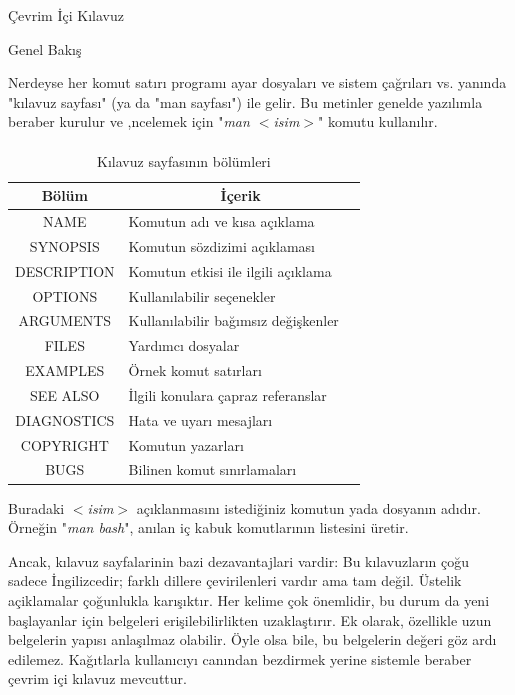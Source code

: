 \begin{section}{Çevrim İçi Kılavuz}
\begin{subsection}{Genel Bakış}

Nerdeyse her komut satırı programı ayar dosyaları ve sistem çağrıları vs. yanında "kılavuz sayfası" (ya da "man sayfası") ile gelir. Bu metinler genelde yazılımla beraber kurulur ve ,ncelemek için "\emph{man $<$isim$>$}" komutu kullanılır.

\paragraph{}{
\begin {table}[H]
\caption {Kılavuz sayfasının bölümleri} \label{tab:title} 
\begin{tabular}{c l @{} l}
\hline
Bölüm &
\multicolumn{2}{c}{İçerik} \\
\hline
NAME 	&	Komutun adı ve kısa açıklama \\
SYNOPSIS &	Komutun sözdizimi açıklaması \\
DESCRIPTION &	Komutun etkisi ile ilgili açıklama \\
OPTIONS &	Kullanılabilir seçenekler \\
ARGUMENTS &	Kullanılabilir bağımsız değişkenler \\
FILES 	&	Yardımcı dosyalar \\
EXAMPLES &	Örnek komut satırları \\
SEE ALSO &	İlgili konulara çapraz referanslar \\
DIAGNOSTICS &	Hata ve uyarı mesajları \\
COPYRIGHT & 	Komutun yazarları \\
BUGS	&	Bilinen komut sınırlamaları \\
\hline
\end{tabular}
\end {table}
}

Buradaki \emph{$<$isim$>$} açıklanmasını istediğiniz komutun yada dosyanın adıdır. Örneğin "\emph{man bash}", anılan iç kabuk komutlarının listesini üretir.

Ancak, kılavuz sayfalarinin bazi dezavantajlari vardir: Bu kılavuzların çoğu sadece İngilizcedir; farklı dillere çevirilenleri vardır ama tam değil. Üstelik açiklamalar çoğunlukla karışıktır. Her kelime çok önemlidir, bu durum da yeni başlayanlar için belgeleri erişilebilirlikten uzaklaştırır. Ek olarak, özellikle uzun belgelerin yapısı anlaşılmaz olabilir. Öyle olsa bile, bu belgelerin değeri göz ardı edilemez. Kağıtlarla kullanıcıyı canından bezdirmek yerine sistemle beraber çevrim içi kılavuz mevcuttur.


\end{subsection}
\end{section}

